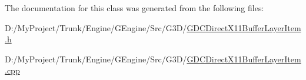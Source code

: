 The documentation for this class was generated from the following files\+:\begin{DoxyCompactItemize}
\item 
D\+:/\+My\+Project/\+Trunk/\+Engine/\+G\+Engine/\+Src/\+G3\+D/\hyperlink{_g_d_c_direct_x11_buffer_layer_item_8h}{G\+D\+C\+Direct\+X11\+Buffer\+Layer\+Item.\+h}\item 
D\+:/\+My\+Project/\+Trunk/\+Engine/\+G\+Engine/\+Src/\+G3\+D/\hyperlink{_g_d_c_direct_x11_buffer_layer_item_8cpp}{G\+D\+C\+Direct\+X11\+Buffer\+Layer\+Item.\+cpp}\end{DoxyCompactItemize}
